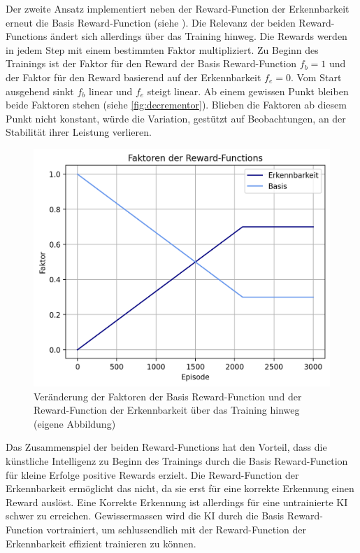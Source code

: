 Der zweite Ansatz implementiert neben der Reward-Function der Erkennbarkeit
erneut die Basis Reward-Function (siehe ). Die Relevanz
der beiden Reward-Functions ändert sich allerdings über das Training hinweg. Die
Rewards werden in jedem Step mit einem bestimmten Faktor multipliziert. Zu
Beginn des Trainings ist der Faktor für den Reward der Basis Reward-Function
$f_b = 1$ und der Faktor für den Reward basierend auf der Erkennbarkeit $f_e =
0$. Vom Start ausgehend sinkt $f_b$ linear und $f_e$ steigt linear. Ab einem
gewissen Punkt bleiben beide Faktoren stehen (siehe \autoref{fig:decrementor}).
Blieben die Faktoren ab diesem Punkt nicht konstant, würde die Variation,
gestützt auf Beobachtungen, an der Stabilität ihrer Leistung verlieren.

\begin{figure}[!ht]
  \centering
  \includegraphics[width=\textwidth-2cm]{images/methode/decrementor.png}
  \caption{Veränderung der Faktoren der Basis Reward-Function und der Reward-Function der Erkennbarkeit über das Training hinweg (eigene Abbildung)}
  \label{fig:decrementor}
\end{figure}

Das Zusammenspiel der beiden Reward-Functions hat den Vorteil, dass die
künstliche Intelligenz zu Beginn des Trainings durch die Basis Reward-Function
für kleine Erfolge positive Rewards erzielt. Die Reward-Function der
Erkennbarkeit ermöglicht das nicht, da sie erst für eine korrekte Erkennung
einen Reward auslöst. Eine Korrekte Erkennung ist allerdings für eine
untrainierte KI schwer zu erreichen. Gewissermassen wird die KI durch die Basis
Reward-Function vortrainiert, um schlussendlich mit der Reward-Function der
Erkennbarkeit effizient trainieren zu können.


